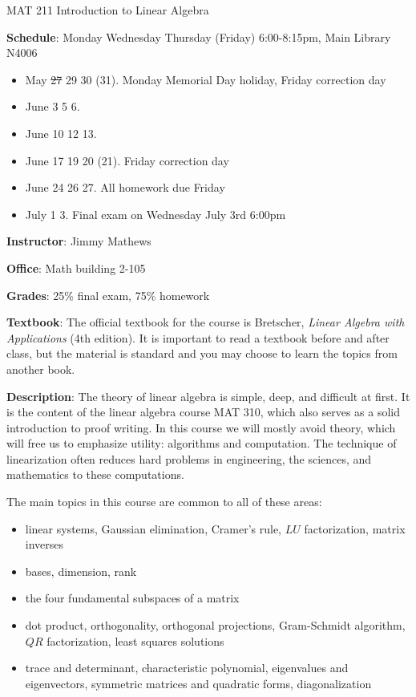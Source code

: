 \documentclass[10pt]{article}
\begin{document}
\setlength\parindent{0pt}

\centerline{ \large MAT 211 Introduction to Linear Algebra}
\vspace{1pc}

\textbf{Schedule}: Monday Wednesday Thursday (Friday) 6:00-8:15pm, Main Library N4006

\begin{itemize}
\item{May \sout{27} 29 30 (31).  Monday Memorial Day holiday, Friday correction day}
\item{June 3 5 6.}
\item{June 10 12 13.}
\item{June 17 19 20 (21).  Friday correction day}
\item{June 24 26 27.  All homework due Friday}
\item{July 1 3.  Final exam on Wednesday July 3rd 6:00pm}
\end{itemize}

\textbf{Instructor}: Jimmy Mathews

\vspace{1pc}

\textbf{Office}: Math building 2-105

\vspace{1pc}

\textbf{Grades}: 25\% final exam, 75\% homework

\vspace{1pc}

\textbf{Textbook}:  The official textbook for the course is Bretscher, \emph{Linear Algebra with Applications} (4th edition).  It is important to read a textbook before and after class, but the material is standard and you may choose to learn the topics from another book.

\vspace{1pc}

\textbf{Description}: The theory of linear algebra is simple, deep, and difficult at first.  It is the content of the linear algebra course MAT 310, which also serves as a solid introduction to proof writing.  In this course we will mostly avoid theory, which will free us to emphasize utility: algorithms and computation.  The technique of linearization often reduces hard problems in engineering, the sciences, and mathematics to these computations.

The main topics in this course are common to all of these areas:
\begin{itemize}
\item{linear systems, Gaussian elimination, Cramer's rule, $LU$ factorization, matrix inverses}
\item{bases, dimension, rank}
\item{the four fundamental subspaces of a matrix}
\item{dot product, orthogonality, orthogonal projections, Gram-Schmidt algorithm, $QR$ factorization, least squares solutions}
\item{trace and determinant, characteristic polynomial, eigenvalues and eigenvectors, symmetric matrices and quadratic forms, diagonalization}
\end{itemize}
\end{document}
